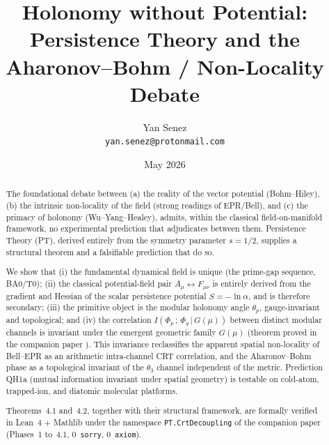 \documentclass[12pt,a4paper]{article}
\title{\textbf{Holonomy without Potential:\\
Persistence Theory and the\\
Aharonov--Bohm / Non-Locality Debate}}
\author{Yan Senez\\
\texttt{yan.senez@protonmail.com}}
\date{May 2026}
\begin{document}
\maketitle

\begin{abstract}
The foundational debate between (a) the reality of the vector
potential (Bohm--Hiley), (b) the intrinsic non-locality of the
field (strong readings of EPR/Bell), and (c) the primacy of
holonomy (Wu--Yang--Healey), admits, within the classical
field-on-manifold framework, no experimental prediction that
adjudicates between them. Persistence Theory (PT), derived
entirely from the symmetry parameter $s = 1/2$, supplies a
structural theorem and a falsifiable prediction that do so.

We show that (i) the fundamental dynamical field is unique
(the prime-gap sequence, BA0/T0); (ii) the classical potential-field
pair $A_\mu \leftrightarrow F_{\mu\nu}$ is entirely derived from
the gradient and Hessian of the scalar persistence potential
$S = -\ln \alpha$, and is therefore secondary; (iii) the primitive
object is the modular holonomy angle $\theta_p$, gauge-invariant
and topological; and (iv) the correlation $I(\Phi_p\,;\,\Phi_q\,|\,
G(\mu))$ between distinct modular channels is invariant under the
emergent geometric family $G(\mu)$ (theorem proved in the companion
paper \cite{PT_CRT_DECOUPLING}). This invariance reclassifies the
apparent spatial non-locality of Bell--EPR as an arithmetic
intra-channel CRT correlation, and the Aharonov--Bohm phase as a
topological invariant of the $\theta_3$ channel independent of the
metric. Prediction QH1a (mutual information invariant under spatial
geometry) is testable on cold-atom, trapped-ion, and diatomic
molecular platforms.

Theorems~4.1 and~4.2, together with their structural framework, are
formally verified in Lean~4 + Mathlib under the namespace
\texttt{PT.CrtDecoupling} of the companion paper
\cite{PT_CRT_DECOUPLING} (Phases~1 to~4.1, 0~\texttt{sorry},
0~\texttt{axiom}).
\end{abstract}

\tableofcontents











\end{document}

